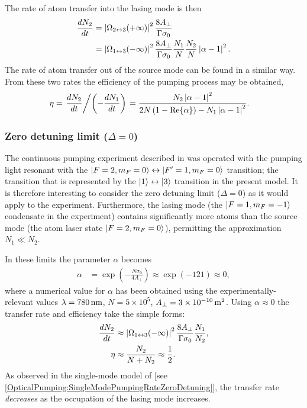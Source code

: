 The rate of atom transfer into the lasing mode is then
\begin{align}
    \frac{d N_2}{dt} &= \abs{\Omega_{2\leftrightarrow 3}(+\infty)}^2 \frac{8 A_\perp}{\Gamma \sigma_0} \\
     &= \abs{\Omega_{1\leftrightarrow 3}(-\infty)}^2 \frac{8 A_\perp}{\Gamma \sigma_0} \frac{N_1}{N} \frac{N_2}{N} \abs{\alpha - 1}^2. \label{OpticalPumping:OverlappingCondensates:TransferRate}
\end{align}
The rate of atom transfer out of the source mode can be found in a similar way.  From these two rates the efficiency of the pumping process may be obtained,
\begin{align}
    \eta &= \left.\frac{d N_2}{d t} \middle / \left(- \frac{d N_1}{dt}\right)\right. = \frac{N_2 \left|\alpha - 1\right|^2}{2 N \left(1 - \operatorname{Re}\{\alpha\}\right) - N_1 \left|\alpha -1\right|^2}.
\end{align}

\subsubsection{Zero detuning limit ($\Delta = 0$)}

The continuous pumping experiment described in  was operated with the pumping light resonant with the ${\left|F=2, m_F=0\right>} \leftrightarrow {\ensuremath{\left|F'=1, m_F=0\right>}}$ transition; the transition that is represented by the ${\left|1\right>} \leftrightarrow {\ensuremath{\left|3\right>}}$ transition in the present model.  It is therefore interesting to consider the zero detuning limit ($\Delta = 0$) as it would apply to the experiment.  Furthermore, the lasing mode (the ${\left|F=1, m_F=-1\right>}$ condensate in the experiment) contains significantly more atoms than the source mode (the atom laser state ${\left|F=2, m_F=0\right>}$), permitting the approximation $N_1 \ll N_2$.  

In these limits the parameter $\alpha$ becomes
\begin{align}
    \alpha &= \exp\left( - \frac{N \sigma_0}{4 A_\perp}\right) \approx \exp(- 121) \approx 0,
\end{align}
where a numerical value for $\alpha$ has been obtained using the experimentally-relevant values $\lambda = \unit[780]{nm}$, $N = 5 \times 10^5$, $A_\perp = 3\times\unit[10^{-10}]{m\textsuperscript{2}}$.  Using $\alpha \approx 0$ the transfer rate and efficiency take the simple forms:
\begin{align}
    \frac{d N_2}{dt} &\approx \abs{\Omega_{1\leftrightarrow 3}(-\infty)}^2 \frac{8 A_\perp}{\Gamma \sigma_0} \frac{N_1}{N_2}, \label{OpticalPumping:OverlappingCondensates:ZeroDetuningTransferRate}\\
    \eta &\approx \frac{N_2}{N + N_2} \approx \frac{1}{2} \label{OpticalPumping:OverlappingCondensates:ZeroDetuningEfficiency}.
\end{align}
As observed in the single-mode model of  [see \eqref{OpticalPumping:SingleModePumpingRateZeroDetuning}], the transfer rate \emph{decreases} as the occupation of the lasing mode increases.  

